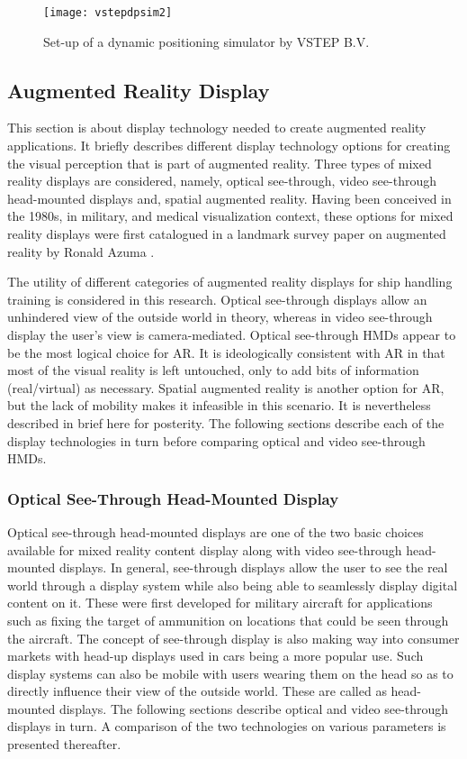 \begin{figure}
	\centering
	\texttt{[image: vstepdpsim2]}
	\caption{Set-up of a dynamic positioning simulator by VSTEP B.V.}
	\label{fig:vstepdpsim}
\end{figure}


\subsection{Augmented Reality Display}
This section is about display technology needed to create augmented reality applications. It briefly describes different display technology options for creating the visual perception that is part of augmented reality. Three types of mixed reality displays are considered, namely, optical see-through, video see-through head-mounted displays and, spatial augmented reality. Having been conceived in the 1980s, in military, and medical visualization context, these options for mixed reality displays were first catalogued in a landmark survey paper on augmented reality by Ronald Azuma \parencite{azuma1997survey}. 

The utility of different categories of augmented reality displays for ship handling training is considered in this research. Optical see-through displays allow an unhindered view of the outside world in theory, whereas in video see-through display the user's view is camera-mediated. Optical see-through HMDs appear to be the most logical choice for AR. It is ideologically consistent with AR in that most of the visual reality is left untouched, only to add bits of information (real/virtual) as necessary. Spatial augmented reality is another option for AR, but the lack of mobility makes it infeasible in this scenario. It is nevertheless described in brief here for posterity. The following sections describe each of the display technologies in turn before comparing optical and video see-through HMDs. 

\subsubsection{Optical See-Through Head-Mounted Display}
Optical see-through head-mounted displays are one of the two basic choices available for mixed reality content display along with video see-through head-mounted displays. In general, see-through displays allow the user to see the real world through a display system while also being able to seamlessly display digital content on it. These were first developed for military aircraft for applications such as fixing the target of ammunition on locations that could be seen through the aircraft. The concept of see-through display is also making way into consumer markets with head-up displays used in cars being a more popular use. Such display systems can also be mobile with users wearing them on the head so as to directly influence their view of the outside world. These are called as head-mounted displays. The following sections describe optical and video see-through displays in turn. A comparison of the two technologies on various parameters is presented thereafter.

